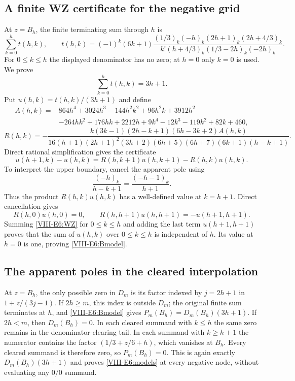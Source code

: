 \documentclass[11pt,letterpaper]{article}
\numberwithin{equation}{section}
\begin{document}
\subsection{A finite WZ certificate for the negative grid}
At $z=B_h$, the finite terminating sum through $h$ is
\[
 \sum_{k=0}^{h} t(h,k),\qquad
 t(h,k)=(-1)^k(6k+1)
 \frac{(1/3)_k(-h)_k(2h+1)_k(2h+4/3)_k}
 {k!(h+4/3)_k(1/3-2h)_k(-2h)_k}.
\]
For $0\le k\le h$ the displayed denominator has no zero;
at $h=0$ only $k=0$ is used. We prove
\begin{equation}\label{VIII-E6:Bmodel}
 \sum_{k=0}^{h}t(h,k)=3h+1.
\end{equation}
Put $u(h,k)=t(h,k)/(3h+1)$ and define
\[
 \begin{split}
 A(h,k)={}&864h^4+3024h^3-144h^2k^2+96h^2k+3912h^2\\
 &-264hk^2+176hk+2212h+9k^4-12k^3-119k^2+82k+460,
 \end{split}
\]
\[
 R(h,k)=
 -\frac{k(3k-1)(2h-k+1)(6h-3k+2)A(h,k)}
 {16(h+1)(2h+1)^2(3h+2)(6h+5)(6h+7)(6k+1)(h-k+1)}.
\]
Direct rational simplification gives the certificate
\begin{equation}\label{VIII-E6:WZ}
 u(h+1,k)-u(h,k)
 =R(h,k+1)u(h,k+1)-R(h,k)u(h,k).
\end{equation}
To interpret the upper boundary, cancel the apparent pole using
\[
 \frac{(-h)_k}{h-k+1}=
 \frac{(-h-1)_k}{h+1}.
\]
Thus the product $R(h,k)u(h,k)$ has a well-defined value at
$k=h+1$. Direct cancellation gives
\[
 R(h,0)u(h,0)=0,\qquad
 R(h,h+1)u(h,h+1)=-u(h+1,h+1).
\]
Summing \eqref{VIII-E6:WZ} for $0\le k\le h$ and adding the last term
$u(h+1,h+1)$ proves that the sum of $u(h,k)$ over $0\le k\le h$
is independent of $h$. Its value at $h=0$ is one, proving
\eqref{VIII-E6:Bmodel}.

\subsection{The apparent poles in the cleared interpolation}
At $z=B_h$, the only possible zero in $D_m$ is its factor indexed
by $j=2h+1$ in $1+z/(3j-1)$.
If $2h\ge m$, this index is outside $D_m$; the original finite
sum terminates at $h$, and \eqref{VIII-E6:Bmodel} gives
$P_m(B_h)=D_m(B_h)(3h+1)$.
If $2h<m$, then $D_m(B_h)=0$. In each cleared summand with
$k\le h$ the same zero remains in the denominator-clearing tail.
In each summand with $k\ge h+1$ the numerator contains the factor
$(1/3+z/6+h)$, which vanishes at $B_h$.
Every cleared summand is therefore zero, so $P_m(B_h)=0$.
This is again exactly $D_m(B_h)(3h+1)$ and proves
\eqref{VIII-E6:models} at every negative node, without evaluating any
$0/0$ summand.
\end{document}
